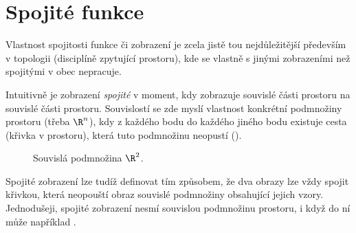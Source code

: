 \section{Spojité funkce}
\label{sec:spojite-funkce}

Vlastnost spojitosti funkce či zobrazení je zcela jistě tou nejdůležitější
především v topologii (disciplíně zpytující  prostoru), kde se vlastně
s jinými zobrazeními než spojitými v obec nepracuje.

Intuitivně je zobrazení \emph{spojité} v moment, kdy zobrazuje souvislé části
prostoru na souvislé části prostoru. Souvislostí se zde myslí vlastnost
konkrétní podmnožiny prostoru (třeba $\R^{n}$), kdy z každého bodu do každého
jiného bodu existuje cesta (křivka v prostoru), která tuto podmnožinu neopustí
().

\begin{figure}[ht]
 \centering
 \caption{Souvislá podmnožina $\R^2$.}
 \label{fig:souvisla-podmnozina}
\end{figure}

Spojité zobrazení lze tudíž definovat tím způsobem, že dva obrazy lze vždy
spojit křivkou, která neopouští obraz souvislé podmnožiny obsahující jejich
vzory. Jednodušeji, spojité zobrazení nesmí  souvislou podmnožinu
prostoru, i když do ní může například .

